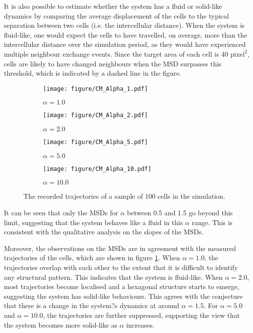 \documentclass[a4paper,12pt]{article}
\begin{document}
It is also possible to estimate whether the system has a fluid or solid-like dynamics by comparing the average displacement of the cells to the typical separation between two cells (i.e. the intercellular distance). When the system is fluid-like, one would expect the cells to have travelled, on average, more than the intercellular distance over the simulation period, as they would have experienced multiple neighbour exchange events. Since the target area of each cell is 40 $\textrm{pixel}^2$, cells are likely to have changed neighbours when the MSD surpasses this threshold, which is indicated by a dashed line in the figure. 
\begin{figure}[h]
\centering
\begin{subfigure}[h]{0.49\textwidth}
\texttt{[image: figure/CM\_Alpha\_1.pdf]}
\caption*{$\alpha = 1.0$}
\end{subfigure}
\begin{subfigure}[h]{0.49\textwidth}
\texttt{[image: figure/CM\_Alpha\_2.pdf]}
\caption*{$\alpha = 2.0$}
\end{subfigure}
\begin{subfigure}[h]{0.49\textwidth}
\texttt{[image: figure/CM\_Alpha\_5.pdf]}
\caption*{$\alpha = 5.0$}
\end{subfigure}
\begin{subfigure}[h]{0.49\textwidth}
\texttt{[image: figure/CM\_Alpha\_10.pdf]}
\caption*{$\alpha = 10.0$}
\end{subfigure}
\caption{The recorded trajectories of a sample of 100 cells in the simulation. }
\label{fig:CM}
\end{figure}
 It can be seen that only the MSDs for $\alpha$ between 0.5 and 1.5 go beyond this limit, suggesting that the system behaves like a fluid in this $\alpha$ range. This is consistent with the qualitative analysis on the slopes of the MSDs. 

Moreover, the observations on the MSDs are in agreement with the measured trajectories of the cells, which are shown in figure \ref{fig:CM}. When $\alpha = 1.0$, the trajectories overlap with each other to the extent that it is difficult to identify any structural pattern. This indicates that the system is fluid-like. When $\alpha = 2.0$, most trajectories become localised and a hexagonal structure starts to emerge, suggesting the system has solid-like behaviours. This agrees with the conjecture that there is a change in the system?s dynamics at around $\alpha = 1.5$. For $\alpha = 5.0$ and $\alpha = 10.0$, the trajectories are further suppressed, supporting the view that the system becomes more solid-like as $\alpha$ increases.  
\end{document}
